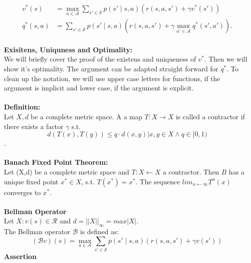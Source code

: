 \begin{align}
v^*(s) &= \max_{a \in \mathcal{A}} \sum_{s' \in \mathcal{S}} p(s' \mid s,a) \left(r(s,a,s') + \gamma v^*(s')\right) \\
q^*(s,a) &= \sum_{s' \in \mathcal{S}} p(s' \mid s,a) \left(r(s,a,s') + \gamma \max_{a' \in \mathcal{A}} q^*(s',a')\right).
\end{align}
\\
\textbf{Exisitens, Uniquness and Optimality:}\\
We will briefly cover the proof of the existens and uniqueness of $v^*$. Then we will show it's optimality. 
The argument can be adapted straight forward for $q^*$. To clean up the notation, we will use upper case letters for functions, if the argument 
is implicit and lower case, if the argument is explicit.\\ \\
\textbf{Definition:}\\
Let $X, d$ be a complete metric space. A a map $T:X \rightarrow X$ is called a contractor if there exists a factor $\gamma$ s.t.
\begin{equation}
    d(T(x), T(y)) \leq q \cdot d(x,y) | x,y \in X \wedge q \in [0, 1)
\end{equation}
.\\ \\
\textbf{Banach Fixed Point Theorem:}\\
Let (X,d) be a complete metric space and $T:X \leftarrow X$ a contractor. 
Then $B$ has a unique fixed point $x^* \in X$, s.t. $T(x^*) = x^*$. The sequence $lim_{n \leftarrow \infty}T^n(x)$ converges to $x^*$.\\ \\

\textbf{Bellman Operator}\\
Let $X : v(s) \in \mathcal{R}$ and $d = ||X||_{\infty} = max|X|$. \\
The Bellman operator $\mathcal{B}$ is defined as:
\begin{equation}
    (\mathcal{B}v)(s) = \max_{a \in \mathcal{A}} \sum_{s' \in \mathcal{S}} p(s' \mid s,a) \left(r(s,a,s') + \gamma v(s')\right)
\end{equation}
\textbf{Assertion}\\

